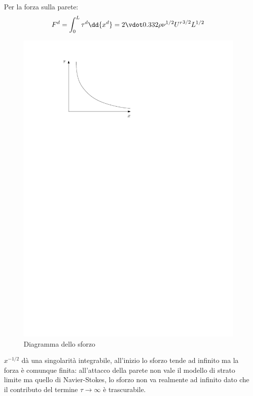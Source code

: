 Per la forza sulla parete:
%
	\begin{equation*}
		F^d = \int_0^L \tau^d \dd{x^d} = 2 \vdot 0.332 \rho \nu^{1/2} {U^r}^{3/2} L^{1/2}
	\end{equation*}
%
	\begin{figure}[ht]
		\includegraphics[scale=0.8]{./7.4 Strato limite/7.4-4}
		\centering
		\caption{Diagramma dello sforzo}
	\end{figure}
%

$x^{-1/2}$ dà una singolarità integrabile, all'inizio lo sforzo tende ad infinito ma la forza è comunque finita: all'attacco della parete non vale il modello di strato limite ma quello di Navier-Stokes, lo sforzo non va realmente ad infinito dato che il contributo del termine $\tau \rightarrow \infty$ è trascurabile.

